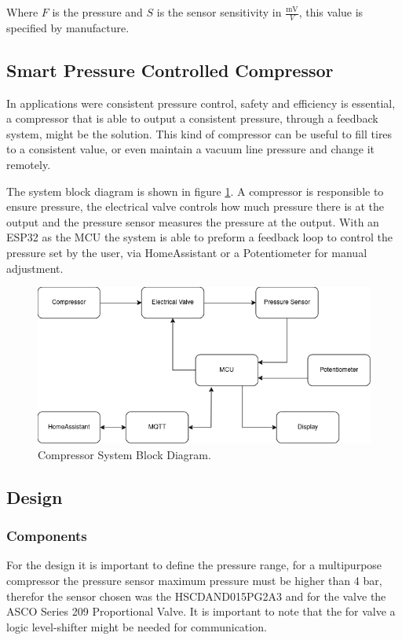 Where $F$ is the pressure and $S$ is the sensor sensitivity in $\frac{\si{\m\V}}{\si{V}}$, this value is specified by manufacture.

\subsection{Smart Pressure Controlled Compressor}

In applications were consistent pressure control, safety and efficiency is essential, a compressor that is able to output a consistent pressure, through a feedback system, might be the solution. This kind of compressor can be useful to fill tires to a consistent value, or even maintain a vacuum line pressure and change it remotely. 

The system block diagram is shown in figure \ref{fig:BlockDiagramP6}. A compressor is responsible to ensure pressure, the electrical valve controls how much pressure there is at the output and the pressure sensor measures the pressure at the output. With an ESP32 as the MCU the system is able to preform a feedback loop to control the pressure set by the user, via HomeAssistant or a Potentiometer for manual adjustment.

\begin{figure}[H]
    \centering
    \includegraphics*[scale = 0.5]{Images/P6Block.png}
    \caption{Compressor System Block Diagram.}
    \label{fig:BlockDiagramP6}
\end{figure}

\subsection{Design}
\subsubsection{Components}
For the design it is important to define the pressure range, for a multipurpose compressor the pressure sensor maximum pressure must be higher than 4 bar, therefor the sensor chosen was the HSCDAND015PG2A3 and for the valve the ASCO Series 209 Proportional Valve. It is important to note that the for valve a logic level-shifter might be needed for communication.

